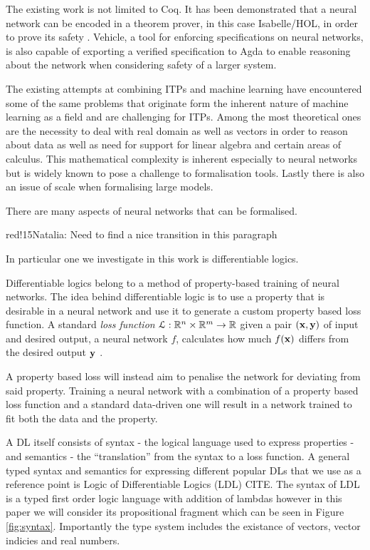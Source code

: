 \documentclass[a4paper,UKenglish,cleveref, autoref, thm-restate]{lipics-v2021}
\newcommand{\natalia}[1]{\begin{authorComment}{red!15}Natalia: #1\end{authorComment}}
\begin{document}
The existing work is not limited to Coq. It has been demonstrated that a neural network can be encoded in a theorem prover, in this case Isabelle/HOL, in order to prove its safety \cite{brucker2023verifying}. Vehicle, a tool for enforcing specifications on neural networks, is also capable of exporting a verified specification to Agda to enable reasoning about the network when considering safety of a larger system\cite{daggitt2023compiling}.

The existing attempts at combining ITPs and machine learning have encountered some of the same problems that originate form the inherent nature of machine learning as a field and are challenging for ITPs. Among the most theoretical ones are the necessity to deal with real domain as well as vectors in order to reason about data as well as need for support for linear algebra and certain areas of calculus. This mathematical complexity is inherent especially to neural networks but is widely known to pose a challenge to formalisation tools. Lastly there is also an issue of scale when formalising large models.

There are many aspects of neural networks that can be formalised. \natalia{Need to find a nice transition in this paragraph}In particular one we investigate in this work is differentiable logics.

Differentiable logics belong to a method of property-based training of neural networks. The idea behind differentiable logic is to use a property that is desirable in a neural network and use it to generate a custom property based loss function. A standard \emph{loss function} $\mathcal{L}: {\mathbb R}^n \times {\mathbb R}^m \rightarrow {\mathbb R}$ given a pair $(\mathbf{x}, \mathbf{y})$ of input and desired output, a neural network $f$, calculates how much $f(\mathbf{x})$ differs from the desired output $\mathbf{y}$ \cite{wang2020comprehensive}.

A property based loss will instead aim to penalise the network for deviating from said property. Training a neural network with a combination of a property based loss function and a standard data-driven one will result in a network trained to fit both the data and the property. 

A DL itself consists of syntax - the logical language used to express properties - and semantics - the ``translation'' from the syntax to a loss function. A general typed syntax and semantics for expressing different popular DLs that we use as a reference point is Logic of Differentiable Logics (LDL) CITE. The syntax of LDL is a typed first order logic language with addition of lambdas however in this paper we will consider its propositional fragment which can be seen in Figure \ref{fig:syntax}. Importantly the type system includes the existance of vectors, vector indicies and real numbers.
\end{document}
